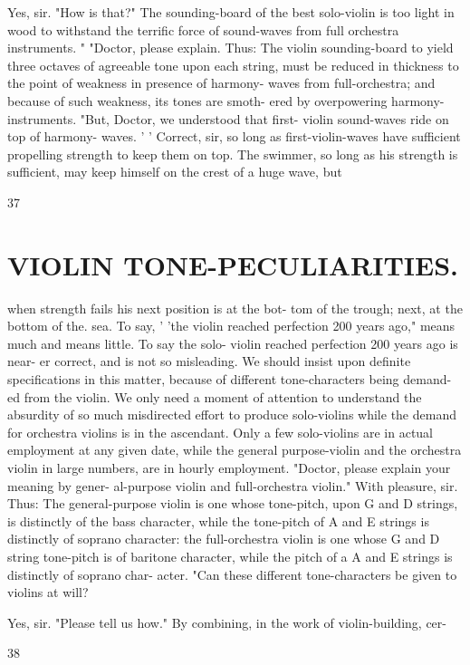 \documentclass{article}
\begin{document}
Yes, sir. "How is that?" The sounding-board of the best solo-violin is too light in wood to withstand the terrific force of sound-waves from full orchestra instruments. " "Doctor, please explain. Thus: The violin sounding-board to yield three octaves of agreeable tone upon each string, must be reduced in thickness to the point of weakness in presence of harmony- waves from full-orchestra; and because of such weakness, its tones are smoth- ered by overpowering harmony-instruments. "But, Doctor, we understood that first- violin sound-waves ride on top of harmony- waves. ' ' Correct, sir, so long as first-violin-waves have sufficient propelling strength to keep them on top. The swimmer, so long as his strength is sufficient, may keep himself on the crest of a huge wave, but

37

\section*{VIOLIN TONE-PECULIARITIES.}
when strength fails his next position is at the bot- tom of the trough; next, at the bottom of the. sea. To say, ' 'the violin reached perfection 200 years ago," means much and means little. To say the solo- violin reached perfection 200 years ago is near- er correct, and is not so misleading. We should insist upon definite specifications in this matter, because of different tone-characters being demand- ed from the violin. We only need a moment of attention to understand the absurdity of so much misdirected effort to produce solo-violins while the demand for orchestra violins is in the ascendant. Only a few solo-violins are in actual employment at any given date, while the general purpose-violin and the orchestra violin in large numbers, are in hourly employment. "Doctor, please explain your meaning by gener- al-purpose violin and full-orchestra violin." With pleasure, sir. Thus: The general-purpose violin is one whose tone-pitch, upon G and D strings, is distinctly of the bass character, while the tone-pitch of A and E strings is distinctly of soprano character: the full-orchestra violin is one whose G and D string tone-pitch is of baritone character, while the pitch of a A and E strings is distinctly of soprano char- acter. "Can these different tone-characters be given to violins at will?

Yes, sir. "Please tell us how." By combining, in the work of violin-building, cer-

38
\end{document}
